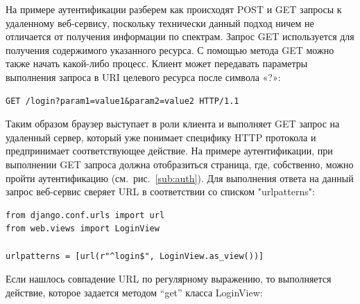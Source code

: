 На примере аутентификации разберем как происходят POST и GET запросы к удаленному веб-сервису, поскольку технически
данный подход ничем не отличается от получения информации по спектрам. Запрос GET используется для получения
содержимого указанного ресурса. С помощью метода GET можно также начать какой-либо процесс. Клиент может передавать
параметры выполнения запроса в URI целевого ресурса после символа «?»:
\begin{verbatim}
GET /login?param1=value1&param2=value2 HTTP/1.1
\end{verbatim}
Таким образом браузер выступает в роли клиента и выполняет GET запрос на удаленный сервер, который уже понимает специфику
HTTP протокола и предпринимает соответствующее действие. На примере аутентификации, при выполнении GET запроса должна
отобразиться страница, где, собственно, можно пройти аутентификацию (см.~рис.~\ref{sub:auth}). Для выполнения ответа
на данный запрос веб-сервис сверяет URL в соответствии со списком "urlpatterns":
\begin{lstlisting}[style=py]
from django.conf.urls import url
from web.views import LoginView

urlpatterns = [url(r"^login$", LoginView.as_view())]
\end{lstlisting}
Если нашлось совпадение URL по регулярному выражению, то выполняется действие, которое задается методом “get” класса LoginView:
